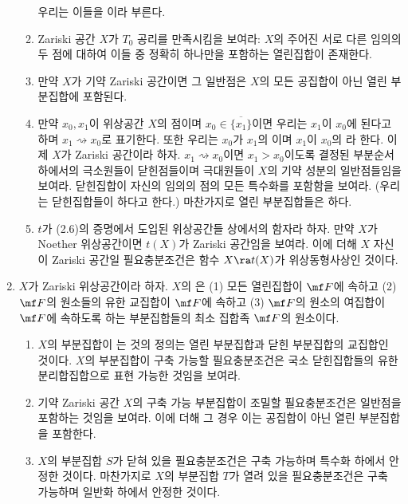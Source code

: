 \begin{enumerate}[label=\tb{3.\arabic*.},itemindent=0mm,itemsep=2mm]
\begin{enumerate}[label=(\alph*)]
	우리는 이들을 이라 부른다.
	\item Zariski 공간 $X$가 $T_0$ 공리를 만족시킴을 보여라:
	$X$의 주어진 서로 다른 임의의 두 점에 대하여 이들 중 정확히 하나만을 포함하는 열린집합이 존재한다.
	\item 만약 $X$가 기약 Zariski 공간이면 그 일반점은 $X$의 모든 공집합이 아닌 열린 부분집합에 포함된다.
	\item 만약 $x_0,x_1$이 위상공간 $X$의 점이며 $x_0\in\overline{\{x_1\}}$이면
	우리는 $x_1$이 $x_0$에 된다고 하며 $x_1\rightsquigarrow x_0$로 표기한다.
	또한 우리는 $x_0$가 $x_1$의 이며 $x_1$이 $x_0$의 라 한다.
	이제 $X$가 Zariski 공간이라 하자. $x_1\rightsquigarrow x_0$이면 $x_1>x_0$이도록 결정된 부분순서 하에서의 극소원들이 닫힌점들이며
	극대원들이 $X$의 기약 성분의 일반점들임을 보여라. 닫힌집합이 자신의 임의의 점의 모든 특수화를 포함함을 보여라.
	(우리는 닫힌집합들이 하다고 한다.)
	마찬가지로 열린 부분집합들은 하다.
	\item $t$가 (2.6)의 증명에서 도입된 위상공간들 상에서의 함자라 하자.
	만약 $X$가 Noether 위상공간이면 $t(X)$가 Zariski 공간임을 보여라.
	이에 더해 $X$ 자신이 Zariski 공간일 필요충분조건은 함수 $X\ra t(X)$가 위상동형사상인 것이다.
	\end{enumerate}
	\item {} $X$가 Zariski 위상공간이라 하자. $X$의 은
	(1) 모든 열린집합이 $\mf F$에 속하고 (2) $\mf F$의 원소들의 유한 교집합이 $\mf F$에 속하고
	(3) $\mf F$의 원소의 여집합이 $\mf F$에 속하도록 하는 부분집합들의 최소 집합족 $\mf F$의 원소이다.
	\begin{enumerate}[label=(\alph*)]
	\item $X$의 부분집합이 는 것의 정의는 열린 부분집합과 닫힌 부분집합의 교집합인 것이다.
	$X$의 부분집합이 구축 가능할 필요충분조건은 국소 닫힌집합들의 유한 분리합집합으로 표현 가능한 것임을 보여라.
	\item 기약 Zariski 공간 $X$의 구축 가능 부분집합이 조밀할 필요충분조건은 일반점을 포함하는 것임을 보여라.
	이에 더해 그 경우 이는 공집합이 아닌 열린 부분집합을 포함한다.
	\item $X$의 부분집합 $S$가 닫혀 있을 필요충분조건은 구축 가능하며 특수화 하에서 안정한 것이다.
	마찬가지로 $X$의 부분집합 $T$가 열려 있을 필요충분조건은 구축 가능하며 일반화 하에서 안정한 것이다.

\end{enumerate}
\end{enumerate}
